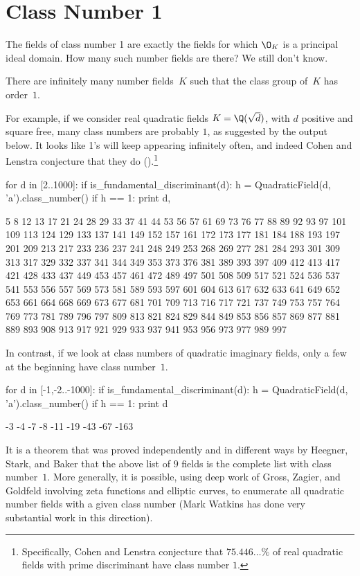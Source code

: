 \section{Class Number 1}\label{sec:cn1}
The fields of class number 1 are exactly the fields for
which $\O_K$ is a principal ideal domain.  How many such
number fields are there?   We still don't know.
\begin{conjecture}
  There are infinitely many number fields~$K$ such that the class
  group of~$K$ has order~$1$.
\end{conjecture}
For example, if we consider real quadratic fields $K=\Q(\sqrt{d})$,
with $d$ positive and square free, many class numbers are probably $1$,
as suggested by the \sage{} output below.
It looks like 1's will keep appearing infinitely often, and indeed
Cohen and Lenstra conjecture that they do
(\cite{cohen-lenstra:heuristics}).\footnote{Specifically, Cohen and
Lenstra conjecture that $75.446\dots\%$ of real quadratic fields
with prime discriminant have class number $1$.}
\begin{sagecode}
\begin{sagecell}
for d in [2..1000]:
    if is_fundamental_discriminant(d):
        h = QuadraticField(d, 'a').class_number()
        if h == 1:
            print d,
\end{sagecell}
\begin{sageout}
5 8 12 13 17 21 24 28 29 33 37 41 44 53 56 57 61 69
73 76 77 88 89 92 93 97 101 109 113 124 129 133 137
141 149 152 157 161 172 173 177 181 184 188 193 197
201 209 213 217 233 236 237 241 248 249 253 268 269
277 281 284 293 301 309 313 317 329 332 337 341 344
349 353 373 376 381 389 393 397 409 412 413 417 421
428 433 437 449 453 457 461 472 489 497 501 508 509
517 521 524 536 537 541 553 556 557 569 573 581 589
593 597 601 604 613 617 632 633 641 649 652 653 661
664 668 669 673 677 681 701 709 713 716 717 721 737
749 753 757 764 769 773 781 789 796 797 809 813 821
824 829 844 849 853 856 857 869 877 881 889 893 908
913 917 921 929 933 937 941 953 956 973 977 989 997
\end{sageout}
\end{sagecode}
In contrast, if we look at class numbers of quadratic imaginary fields,
only a few at the beginning have class number~$1$.
\begin{sagecode}
\begin{sagecell}
for d in [-1,-2..-1000]:
    if is_fundamental_discriminant(d):
        h = QuadraticField(d, 'a').class_number()
        if h == 1:
            print d
\end{sagecell}
\begin{sageout}
-3 -4 -7 -8 -11 -19 -43 -67 -163
\end{sageout}
\end{sagecode}
It is a theorem that was proved independently and in different ways by
Heegner, Stark, and Baker that the above list of $9$ fields is the
complete list with class number~$1$.  More generally, it is possible,
using deep work of Gross, Zagier, and Goldfeld involving zeta
functions and elliptic curves, to enumerate all quadratic number
fields with a given class number (Mark Watkins has done very
substantial work in this direction).


